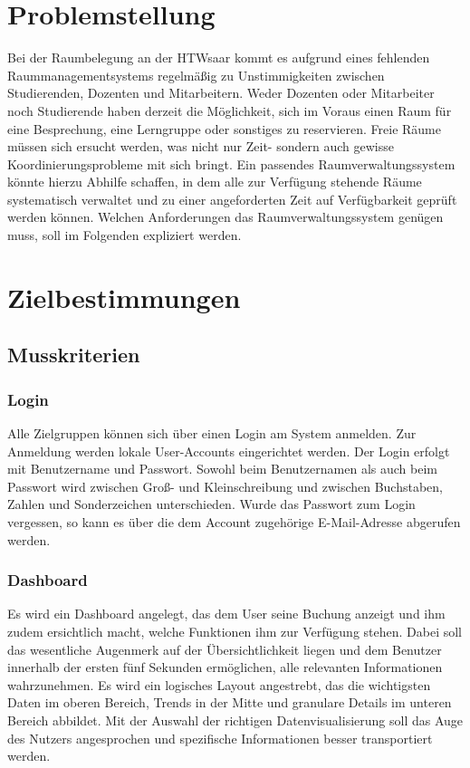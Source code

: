 \documentclass[a4paper,12pt]{article}
\begin{document}
\section{Problemstellung}
Bei der Raumbelegung an der HTWsaar kommt es aufgrund eines fehlenden Raummanagementsystems regelmäßig zu Unstimmigkeiten zwischen Studierenden, Dozenten und Mitarbeitern. Weder Dozenten oder Mitarbeiter noch Studierende haben derzeit die Möglichkeit, sich im Voraus einen Raum für eine Besprechung, eine Lerngruppe oder sonstiges zu reservieren. Freie Räume müssen sich ersucht werden, was nicht nur Zeit- sondern auch gewisse Koordinierungsprobleme mit sich bringt. Ein passendes Raumverwaltungssystem könnte hierzu Abhilfe schaffen, in dem alle zur Verfügung stehende Räume systematisch verwaltet und zu einer angeforderten Zeit auf Verfügbarkeit geprüft werden können. Welchen Anforderungen das Raumverwaltungssystem genügen muss, soll im Folgenden expliziert werden.\\
 
\section{Zielbestimmungen}

\subsection{Musskriterien}

\subsubsection{Login}
Alle Zielgruppen können sich über einen Login am System anmelden. Zur Anmeldung werden lokale User-Accounts eingerichtet werden. Der Login erfolgt mit Benutzername und Passwort. Sowohl beim Benutzernamen als auch beim Passwort wird zwischen Groß- und Kleinschreibung und zwischen Buchstaben, Zahlen und Sonderzeichen unterschieden. Wurde das Passwort zum Login vergessen, so kann es über die dem Account zugehörige E-Mail-Adresse abgerufen werden.

\subsubsection{Dashboard}
Es wird ein Dashboard angelegt, das dem User seine Buchung anzeigt und ihm zudem ersichtlich macht, welche Funktionen ihm zur Verfügung stehen. Dabei soll das wesentliche Augenmerk auf der Übersichtlichkeit liegen und dem Benutzer innerhalb der ersten fünf Sekunden ermöglichen, alle relevanten Informationen wahrzunehmen. Es wird ein logisches Layout angestrebt, das die wichtigsten Daten im oberen Bereich, Trends in der Mitte und granulare Details im unteren Bereich abbildet. Mit der Auswahl der richtigen Datenvisualisierung soll das Auge des Nutzers angesprochen und spezifische Informationen besser transportiert werden.
\end{document}
